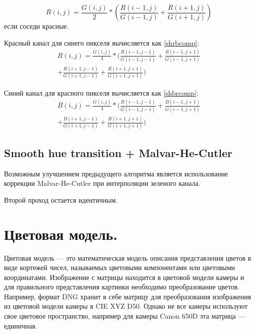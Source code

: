 \begin{equation}
	\label{shrcomp}
	{R}(i,j) = \frac{{G}(i,j)}{2} * (\frac{{R}(i - 1,j)}{{G}(i-1,j)} + \frac{{R}(i+1,j)}{{G}(i+1,j)})
\end{equation}
если соседи красные.

Красный канал для синего пикселя вычисляется как \ref{shrbcomp}:
\begin{equation}
	\begin{split}
	\label{shrbcomp}
	{R}(i,j) = \frac{{G}(i,j)}{4} * (\frac{{R}(i-1,j-1)}{{G}(i-1,j-1)} + \frac{{R}(i-1,j+1)}{{G}(i-1,j+1)} \\ + \frac{{R}(i+1,j-1)}{{G}(i+1,j-1)} + \frac{{R}(i+1,j+1)}{{G}(i+1,j+1)})
	\end{split}
\end{equation}

Синий канал для красного пикселя вычисляется как \ref{shbrcomp}:
\begin{equation}
	\begin{split}
		\label{shbrcomp}
		{B}(i,j) = \frac{{G}(i,j)}{4} * (\frac{{B}(i-1,j-1)}{{G}(i-1,j-1)} + \frac{{B}(i-1,j+1)}{{G}(i-1,j+1)} \\ + \frac{{B}(i+1,j-1)}{{G}(i+1,j-1)} + \frac{{B}(i+1,j+1)}{{G}(i+1,j+1)})
	\end{split}
\end{equation} 

\subsection{Smooth hue transition + Malvar-He-Cutler}
Возможным улучшением предыдущего алгоритма является использование коррекции Malvar-He-Cutler при интерполяции зеленого канала.

Второй проход остается идентичным.

\section{Цветовая модель.}
Цветовая модель --- это математическая модель описания представления цветов в виде кортежей чисел, называемых цветовыми компонентами или цветовыми координатами. Изображение с матрицы находится в цветовой модели камеры и для правильного представления картинки необходимо преобразование цветов. Например, формат DNG хранит в себе матрицу для преобразования изображения из цветовой модели камеры в CIE XYZ D50. Однако не все камеры используют свое цветовое пространство, например для камеры Canon 650D эта матрица --- единичная.

